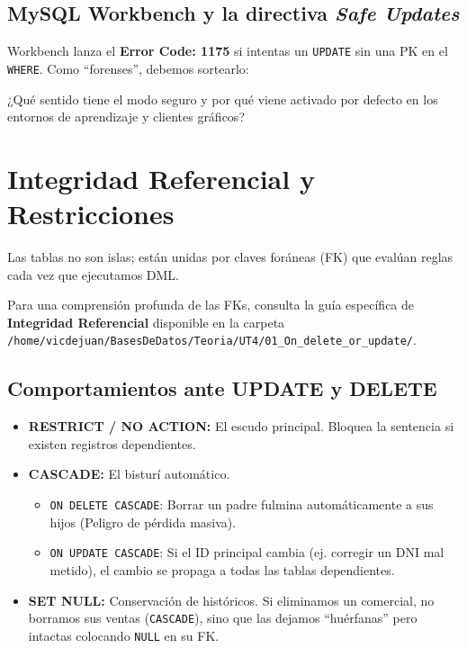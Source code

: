 \documentclass[12pt,a4paper]{article}
\begin{document}
\subsection{MySQL Workbench y la directiva \textit{Safe Updates}}
Workbench lanza el \textbf{Error Code: 1175} si intentas un \texttt{UPDATE} sin una PK en el \texttt{WHERE}. Como ``forenses'', debemos sortearlo:



\begin{tcolorbox}[title=Reflexión 0]
¿Qué sentido tiene el modo seguro y por qué viene activado por defecto en los entornos de aprendizaje y clientes gráficos?
\end{tcolorbox}

\section{Integridad Referencial y Restricciones}
Las tablas no son islas; están unidas por claves foráneas (FK) que evalúan reglas cada vez que ejecutamos DML.

\begin{tcolorbox}[title=Recomendación]
Para una comprensión profunda de las FKs, consulta la guía específica de \textbf{Integridad Referencial} disponible en la carpeta \texttt{/home/vicdejuan/BasesDeDatos/Teoria/UT4/01\_On\_delete\_or\_update/}.
\end{tcolorbox}

\subsection{Comportamientos ante UPDATE y DELETE}
\begin{itemize}
    \item \textbf{RESTRICT / NO ACTION:} El escudo principal. Bloquea la sentencia si existen registros dependientes.
    \item \textbf{CASCADE:} El bisturí automático. 
    \begin{itemize}
        \item \texttt{ON DELETE CASCADE}: Borrar un padre fulmina automáticamente a sus hijos (Peligro de pérdida masiva).
        \item \texttt{ON UPDATE CASCADE}: Si el ID principal cambia (ej. corregir un DNI mal metido), el cambio se propaga a todas las tablas dependientes.
    \end{itemize}
    \item \textbf{SET NULL:} Conservación de históricos. Si eliminamos un comercial, no borramos sus ventas (\texttt{CASCADE}), sino que las dejamos ``huérfanas'' pero intactas colocando \texttt{NULL} en su FK.
\end{itemize}
\end{document}

